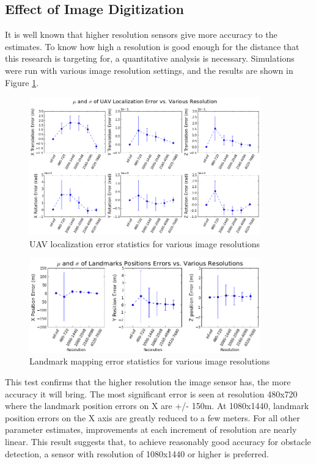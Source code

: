 \subsection{Effect of Image Digitization}

It is well known that higher resolution sensors give more accuracy
to the estimates. To know how high a resolution is good enough for the
distance that this research is targeting for, a quantitative
analysis is necessary. Simulations were run with various image
resolution settings, and the results are shown in Figure
\ref{fig:simfig50}.
\begin{figure}[h] 
  \centering
  \includegraphics[width=10cm,keepaspectratio=true]{./Figures/SimulationFigures/Figure50.png}
  \caption{UAV localization error statistics for various image resolutions}
  \label{fig:simfig50}
\end{figure}

\begin{figure}[h] 
  \centering
  \includegraphics[width=10cm,keepaspectratio=true]{./Figures/SimulationFigures/Figure49.png}
  \caption{Landmark mapping error statistics for various image resolutions}
  \label{fig:simfig51}
\end{figure}

This test confirms that the higher resolution the image sensor has,
the more accuracy it will bring. The most significant error is seen
at resolution 480x720 where the landmark position errors on X are
+/- 150m. At 1080x1440, landmark position errors on the X axis are
greatly reduced to a few meters. For all other parameter estimates,
improvements at each increment of resolution are nearly linear.
This result suggests that, to achieve reasonably good accuracy for
obstacle detection, a sensor with resolution of 1080x1440 or higher is
preferred.


